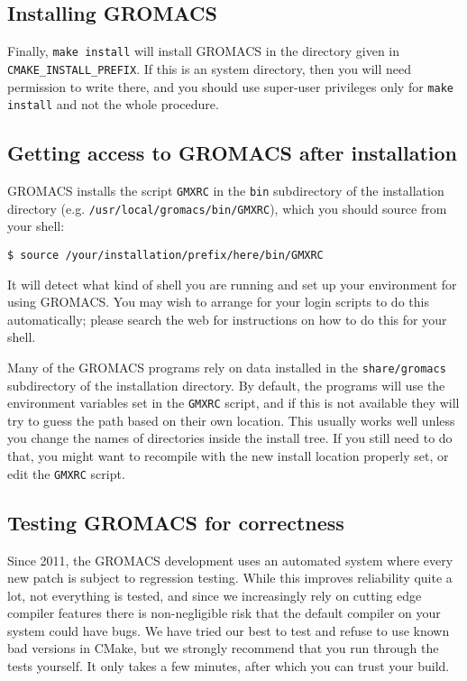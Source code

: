 \documentclass{article}[12pt,a4paper,twoside]
\newcommand{\gromacs}{GROMACS}
\newcommand{\cmake}{CMake}
\begin{document}
\subsection{Installing \gromacs{}}

Finally, \verb+make install+ will install \gromacs{} in the
directory given in \verb+CMAKE_INSTALL_PREFIX+. If this is an system
directory, then you will need permission to write there, and you
should use super-user privileges only for \verb+make install+ and
not the whole procedure.

\subsection{Getting access to \gromacs{} after installation}

\gromacs{} installs the script \verb+GMXRC+ in the \verb+bin+
subdirectory of the installation directory
(e.g. \verb+/usr/local/gromacs/bin/GMXRC+), which you should source
from your shell:
\begin{verbatim}
$ source /your/installation/prefix/here/bin/GMXRC
\end{verbatim}

It will detect what kind of shell you are running and set up your
environment for using \gromacs{}. You may wish to arrange for your
login scripts to do this automatically; please search the web for
instructions on how to do this for your shell. 

Many of the \gromacs{} programs rely on data installed in the
\verb+share/gromacs+ subdirectory of the installation directory. By
default, the programs will use the environment variables set in the
\verb+GMXRC+ script, and if this is not available they will try to guess the
path based on their own location.  This usually works well unless you
change the names of directories inside the install tree. If you still
need to do that, you might want to recompile with the new install
location properly set, or edit the \verb+GMXRC+ script.

\subsection{Testing \gromacs{} for correctness}\label{testing}
Since 2011, the \gromacs{} development uses an automated system where
every new patch is subject to regression testing. While this improves
reliability quite a lot, not everything is tested, and since we
increasingly rely on cutting edge compiler features there is
non-negligible risk that the default compiler on your system could
have bugs. We have tried our best to test and refuse to use known bad
versions in \cmake{}, but we strongly recommend that you run through
the tests yourself. It only takes a few minutes, after which you can
trust your build.
\end{document}
